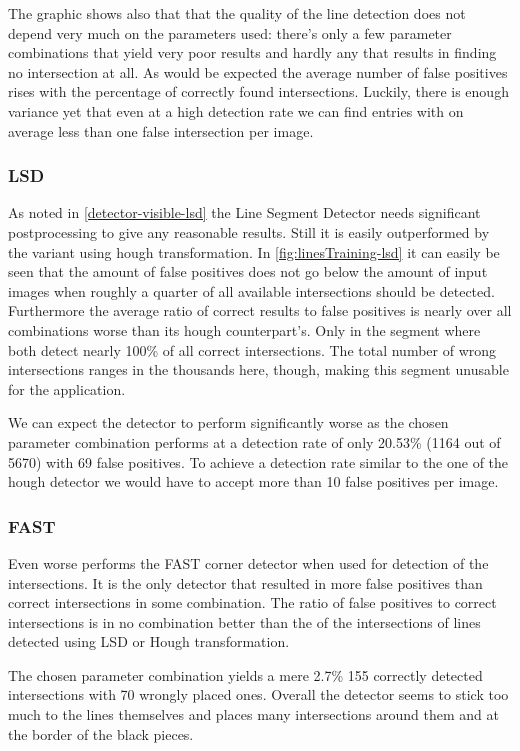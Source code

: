 	The graphic shows also that that the quality of the line detection does not depend very much on the parameters used: there's only a few parameter combinations that yield very poor results and hardly any that results in finding no intersection at all. As would be expected the average number of false positives rises with the percentage of correctly found intersections. Luckily, there is enough variance yet that even at a high detection rate we can find entries with on average less than one false intersection per image.

	\subsubsection{LSD}
	As noted in \autoref{detector-visible-lsd} the Line Segment Detector needs significant postprocessing to give any reasonable results. Still it is easily outperformed by the variant using hough transformation. In \autoref{fig:linesTraining-lsd} it can easily be seen that the amount of false positives does not go below the amount of input images when roughly a quarter of all available intersections should be detected. Furthermore the average ratio of correct results to false positives is nearly over all combinations worse than its hough counterpart's. Only in the segment where both detect nearly 100\% of all correct intersections. The total number of wrong intersections ranges in the thousands here, though, making this segment unusable for the application.

	We can expect the detector to perform significantly worse as the chosen parameter combination performs at a detection rate of only 20.53\% (1164 out of 5670) with 69 false positives. To achieve a detection rate similar to the one of the hough detector we would have to accept more than 10 false positives per image.

	\subsubsection{FAST}
	Even worse performs the FAST corner detector when used for detection of the intersections. It is the only detector that resulted in more false positives than correct intersections in some combination. The ratio of false positives to correct intersections is in no combination better than the of the intersections of lines detected using LSD or Hough transformation.

	The chosen parameter combination yields a mere 2.7\% 155 correctly detected intersections with 70 wrongly placed ones. Overall the detector seems to stick too much to the lines themselves and places many intersections around them and at the border of the black pieces. %

